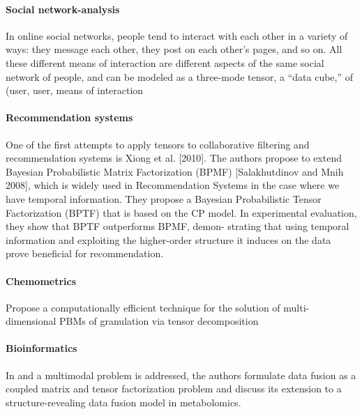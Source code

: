 \documentclass[letterpaper,12pt]{article}
\begin{document}

\paragraph{Social network-analysis}


In online social networks, people tend to interact with each other in a variety of ways: they message each other, they post on each other’s pages, and so on. All these different means of interaction are different aspects of the same social network of people, and can be modeled as a three-mode tensor, a “data cube,” of (user, user, means of interaction \cite{Papalexakis2016}

\paragraph{Recommendation systems} 

One of the first attempts to apply tensors to collaborative filtering and recommendation systems is Xiong et al. [2010]. The authors propose to extend Bayesian Probabilistic Matrix Factorization (BPMF) [Salakhutdinov and Mnih 2008], which is widely used in Recommendation Systems in the case where we have temporal information. They propose a Bayesian Probabilistic Tensor Factorization (BPTF) that is based on the CP model. In experimental evaluation, they show that BPTF outperforms BPMF, demon- strating that using temporal information and exploiting the higher-order structure it induces on the data prove beneficial for recommendation.


\paragraph{Chemometrics}

\cite{Chaudhury2014} Propose a computationally efficient technique for the solution of multi-dimensional PBMs of granulation via tensor decomposition

\paragraph{Bioinformatics}

In \cite{Acar2015} and \cite{Acar2014} a multimodal problem is addressed, the authors formulate data fusion as a coupled matrix and tensor factorization problem and discuss its extension to a structure-revealing data fusion model in metabolomics.
\end{document}
